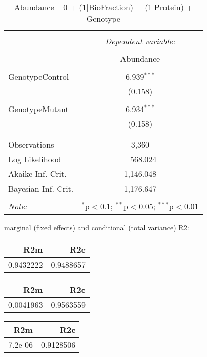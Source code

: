 \documentclass[11pt]{report}
\begin{document}
\begin{table}[!htbp] \centering 
  \caption{Abundance ~ 0 + (1|BioFraction) + (1|Protein) + Genotype} 
  \label{} 
\begin{tabular}{@{\extracolsep{5pt}}lc} 
\\[-1.8ex]\hline 
\hline \\[-1.8ex] 
 & \multicolumn{1}{c}{\textit{Dependent variable:}} \\ 
\cline{2-2} 
\\[-1.8ex] & Abundance \\ 
\hline \\[-1.8ex] 
 GenotypeControl & 6.939$^{***}$ \\ 
  & (0.158) \\ 
  & \\ 
 GenotypeMutant & 6.934$^{***}$ \\ 
  & (0.158) \\ 
  & \\ 
\hline \\[-1.8ex] 
Observations & 3,360 \\ 
Log Likelihood & $-$568.024 \\ 
Akaike Inf. Crit. & 1,146.048 \\ 
Bayesian Inf. Crit. & 1,176.647 \\ 
\hline 
\hline \\[-1.8ex] 
\textit{Note:}  & \multicolumn{1}{r}{$^{*}$p$<$0.1; $^{**}$p$<$0.05; $^{***}$p$<$0.01} \\ 
\end{tabular} 
\end{table} 
marginal (fixed effects) and conditional (total variance) R2:

\begin{tabular}{r|r}
\hline
R2m & R2c\\
\hline
0.9432222 & 0.9488657\\
\hline
\end{tabular}

\begin{tabular}{r|r}
\hline
R2m & R2c\\
\hline
0.0041963 & 0.9563559\\
\hline
\end{tabular}

\begin{tabular}{r|r}
\hline
R2m & R2c\\
\hline
7.2e-06 & 0.9128506\\
\hline
\end{tabular}
\end{document}
